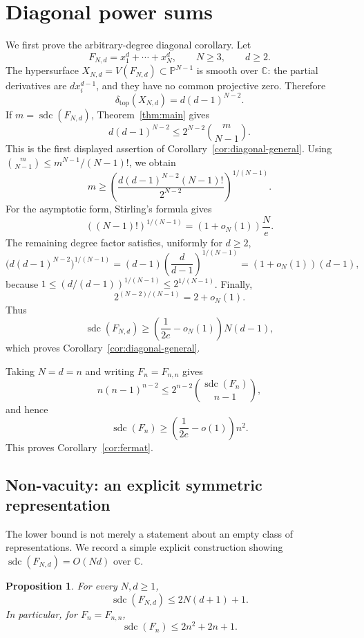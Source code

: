 \documentclass[11pt]{article}
\theoremstyle{plain}
\newtheorem{proposition}{Proposition}
\theoremstyle{definition}
\DeclareMathOperator{\sdc}{sdc}
\newcommand{\PP}{\mathbb{P}}
\newcommand{\CC}{\mathbb{C}}
\newcommand{\pdeg}{\delta}
\begin{document}
\section{Diagonal power sums}
\label{sec:fermat}

We first prove the arbitrary-degree diagonal corollary.  Let
\[
  F_{N,d}=x_1^d+\cdots+x_N^d,
  \qquad N\ge3,
  \qquad d\ge2.
\]
The hypersurface $X_{N,d}=V(F_{N,d})\subset\PP^{N-1}$ is smooth over $\CC$:
the partial derivatives are $d x_i^{d-1}$, and they have no common projective
zero.  Therefore
\[
  \pdeg_{\mathrm{top}}(X_{N,d})=d(d-1)^{N-2}.
\]
If $m=\sdc(F_{N,d})$, Theorem~\ref{thm:main} gives
\begin{equation}
\label{eq:diagonalineq}
  d(d-1)^{N-2}\le 2^{N-2}\binom{m}{N-1}.
\end{equation}
This is the first displayed assertion of Corollary~\ref{cor:diagonal-general}.
Using $\binom{m}{N-1}\le m^{N-1}/(N-1)!$, we obtain
\[
  m
  \ge
  \left(
  \frac{d(d-1)^{N-2}(N-1)!}{2^{N-2}}
  \right)^{1/(N-1)}.
\]
For the asymptotic form, Stirling's formula gives
\[
  ((N-1)!)^{1/(N-1)}=(1+o_N(1))\frac{N}{e}.
\]
The remaining degree factor satisfies, uniformly for $d\ge2$,
\[
  \big(d(d-1)^{N-2}\big)^{1/(N-1)}
  =(d-1)\left(\frac{d}{d-1}\right)^{1/(N-1)}
  =(1+o_N(1))(d-1),
\]
because $1\le(d/(d-1))^{1/(N-1)}\le2^{1/(N-1)}$.  Finally,
\[
  2^{(N-2)/(N-1)}=2+o_N(1).
\]
Thus
\[
  \sdc(F_{N,d})
  \ge \left(\frac{1}{2e}-o_N(1)\right)N(d-1),
\]
which proves Corollary~\ref{cor:diagonal-general}.

Taking $N=d=n$ and writing $F_n=F_{n,n}$ gives
\[
  n(n-1)^{n-2}\le 2^{n-2}\binom{\sdc(F_n)}{n-1},
\]
and hence
\[
  \sdc(F_n)\ge \left(\frac{1}{2e}-o(1)\right)n^2.
\]
This proves Corollary~\ref{cor:fermat}.

\subsection{Non-vacuity: an explicit symmetric representation}
\label{subsec:upper}

The lower bound is not merely a statement about an empty class of
representations.  We record a simple explicit construction showing
$\sdc(F_{N,d})=O(Nd)$ over $\CC$.

\begin{proposition}
\label{prop:upper}
For every $N,d\ge1$,
\[
  \sdc(F_{N,d})\le 2N(d+1)+1.
\]
In particular, for $F_n=F_{n,n}$,
\[
  \sdc(F_n)\le 2n^2+2n+1.
\]
\end{proposition}
\end{document}
